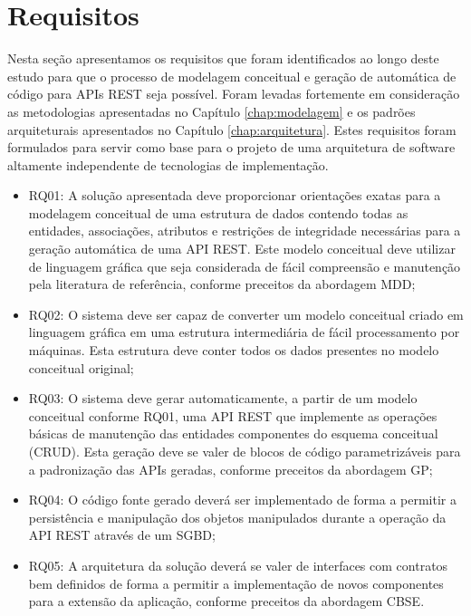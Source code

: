 
\section{Requisitos}
\label{sec:reqs}

Nesta seção apresentamos os requisitos que foram identificados ao longo deste estudo para que o processo de modelagem conceitual e geração de automática de código para APIs REST seja possível. Foram levadas fortemente em consideração as metodologias apresentadas no Capítulo \ref{chap:modelagem} e os padrões arquiteturais apresentados no Capítulo \ref{chap:arquitetura}. Estes requisitos foram formulados para servir como base para o projeto de uma arquitetura de software altamente independente de tecnologias de implementação.

\begin{itemize}
    \item RQ01: A solução apresentada deve proporcionar orientações exatas para a modelagem conceitual de uma estrutura de dados contendo todas as entidades, associações, atributos e restrições de integridade necessárias para a geração automática de uma API REST. Este modelo conceitual deve utilizar de linguagem gráfica que seja considerada de fácil compreensão e manutenção pela literatura de referência, conforme preceitos da abordagem MDD;
    \item RQ02: O sistema deve ser capaz de converter um modelo conceitual criado em linguagem gráfica em uma estrutura intermediária de fácil processamento por máquinas. Esta estrutura deve conter todos os dados presentes no modelo conceitual original;
    \item RQ03: O sistema deve gerar automaticamente, a partir de um modelo conceitual conforme RQ01, uma API REST que implemente as operações básicas de manutenção das entidades componentes do esquema conceitual (CRUD). Esta geração deve se valer de blocos de código parametrizáveis para a padronização das APIs geradas, conforme preceitos da abordagem GP;
    \item RQ04: O código fonte gerado deverá ser implementado de forma a permitir a persistência e manipulação dos objetos manipulados durante a operação da API REST através de um SGBD;
    \item RQ05: A arquitetura da solução deverá se valer de interfaces com contratos bem definidos de forma a permitir a implementação de novos componentes para a extensão da aplicação, conforme preceitos da abordagem CBSE.
\end{itemize}

